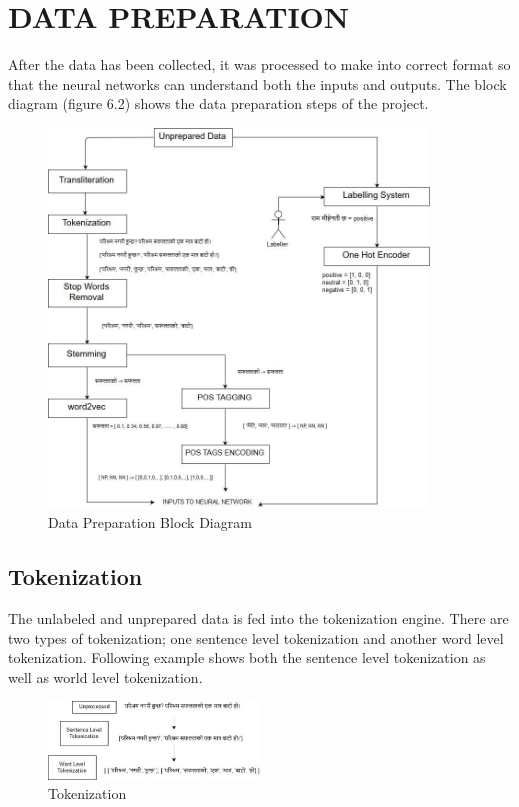             \section{DATA PREPARATION}
After the data has been collected, it was processed to make into correct format so that
the neural networks can understand both the inputs and outputs. The block diagram
(figure 6.2) shows the data preparation steps of the project.
        \begin{figure}[hbt!]
            \centering
                \includegraphics[width=0.9\textwidth]{./img/6.4.jpg}
                \caption{Data Preparation Block Diagram}
        \end{figure}

                \subsection{Tokenization}
The unlabeled and unprepared data is fed into the tokenization engine. There are two
types of tokenization; one sentence level tokenization and another word level
tokenization. Following example shows both the sentence level tokenization as well as
world level tokenization.
        \begin{figure}[hbt!]
            \centering
                \includegraphics[width=0.5\textwidth]{./img/6.5.jpg}
                \caption{Tokenization }
        \end{figure}
